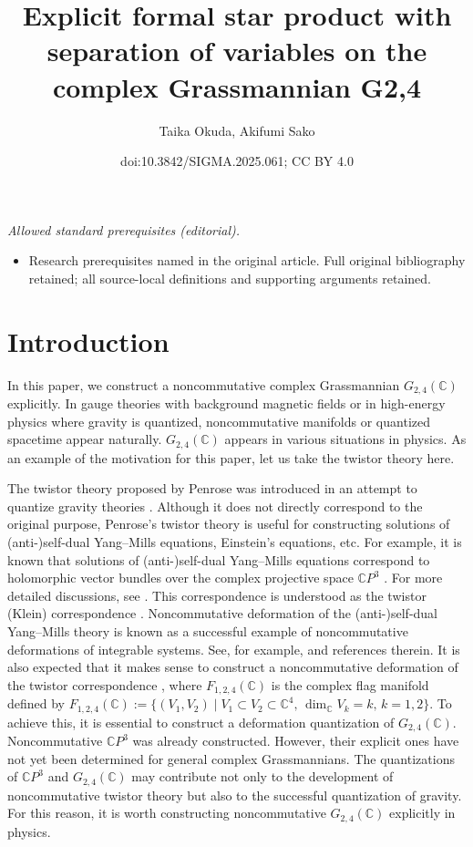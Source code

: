 \documentclass[10pt,a4paper]{amsart}
\title{Explicit formal star product with separation of variables on the complex Grassmannian G2,4}
\author{Taika Okuda, Akifumi Sako}
\date{doi:10.3842/SIGMA.2025.061; CC BY 4.0}
\numberwithin{equation}{section}
\begin{document}
\maketitle
\noindent\textit{Allowed standard prerequisites (editorial).}\begin{itemize}
\item Research prerequisites named in the original article. Full original bibliography retained; all source-local definitions and supporting arguments retained.
\end{itemize}\medskip
\section{Introduction}
\label{G24_introduction}

In this paper, we construct a noncommutative complex Grassmannian $G_{2,4}(\mathbb{C})$ explicitly.
In gauge theories with background magnetic fields or in high-energy physics where gravity is quantized, %
noncommutative manifolds or quantized spacetime appear naturally. $G_{2,4}(\mathbb{C})$ appears in various situations in physics. As an example of the motivation for this paper, let us take the twistor theory here.

The twistor theory proposed by Penrose was introduced in an attempt to quantize gravity theories \cite{Pen1,Pen2,Pen3}. Although it does not directly correspond to the original purpose, %
Penrose's twistor theory is useful for constructing solutions of (anti-)self-dual Yang--Mills equations, Einstein's equations, etc. For example, it is known that solutions of (anti-)self-dual Yang--Mills equations correspond to holomorphic vector bundles over the complex projective space $\mathbb{C}P^{3}$ \cite{Pen1,Pen2,Pen3,Ward1,WaWe}.
For more detailed discussions, see \cite{MW,WaWe}. This correspondence is understood as the twistor (Klein) correspondence . Noncommutative deformation of the (anti-)self-dual Yang--Mills theory is known as a successful example of noncommutative deformations of integrable systems.
See, for example, \cite{Hama1,HaNa1,NS} and references therein.
It is also expected that it makes sense to construct a noncommutative deformation of the twistor correspondence ,
where $F_{1,2,4}(\mathbb{C})$ is the complex flag manifold defined by
$F_{1,2,4}(\mathbb{C})
:=\{(V_{1},V_{2})\mid
V_{1}
\subset
V_{2}
\subset
\mathbb{C}^{4},\,
\dim_{\mathbb{C}}
V_{k}
=
k,\,
k=1,2
\} $.
To achieve this, it is essential to construct a deformation quantization of $G_{2,4}(\mathbb{C})$. Noncommutative $\mathbb{C}P^{3}$ was already constructed. However, their explicit ones have not yet been determined for general complex Grassmannians. The quantizations of $\mathbb{C}P^{3}$ and $G_{2,4}(\mathbb{C})$ may contribute not only to the development of noncommutative twistor theory but also to the successful quantization of gravity.
For this reason, it is worth constructing noncommutative $G_{2,4}(\mathbb{C})$ explicitly in physics.
\end{document}
